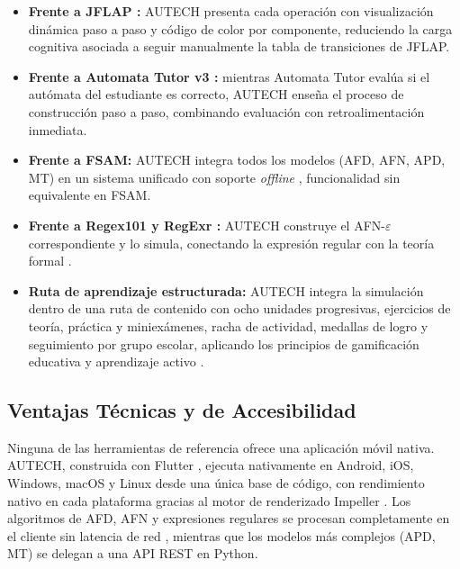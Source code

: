 \begin{itemize}
    \item \textbf{Frente a JFLAP \cite{rodger2006}:} AUTECH presenta cada operación con
    visualización dinámica paso a paso y código de color por componente, reduciendo la carga
    cognitiva \cite{sweller1988} asociada a seguir manualmente la tabla de transiciones de JFLAP.

    \item \textbf{Frente a Automata Tutor v3 \cite{aichernig2022}:} mientras Automata Tutor evalúa
    si el autómata del estudiante es correcto, AUTECH enseña el proceso de construcción paso a
    paso, combinando evaluación con retroalimentación inmediata.

    \item \textbf{Frente a FSAM:} AUTECH integra todos los modelos (AFD, AFN, APD, MT) en un
    sistema unificado con soporte \textit{offline} \cite{supabase2024}, funcionalidad sin
    equivalente en FSAM.

    \item \textbf{Frente a Regex101 y RegExr \cite{fycikas2021}\cite{skinner2021}:} AUTECH
    construye el AFN-$\varepsilon$ correspondiente y lo simula, conectando la expresión regular con
    la teoría formal \cite{hopcroft2007}\cite{thompson1968}.

    \item \textbf{Ruta de aprendizaje estructurada:} AUTECH integra la simulación dentro de una
    ruta de contenido con ocho unidades progresivas, ejercicios de teoría, práctica y
    miniexámenes, racha de actividad, medallas de logro y seguimiento por grupo escolar, aplicando
    los principios de gamificación educativa \cite{deterding2011} y aprendizaje activo
    \cite{felder2016}.
\end{itemize}

\subsection{Ventajas Técnicas y de Accesibilidad}
\label{subsec:ventajas_tecnicas}

Ninguna de las herramientas de referencia ofrece una aplicación móvil nativa. AUTECH, construida
con Flutter \cite{flutter2024c}, ejecuta nativamente en Android, iOS, Windows, macOS y Linux desde
una única base de código, con rendimiento nativo en cada plataforma gracias al motor de renderizado
Impeller \cite{flutter2024a}. Los algoritmos de AFD, AFN y expresiones regulares se procesan
completamente en el cliente sin latencia de red \cite{fielding2000}, mientras que los modelos más
complejos (APD, MT) se delegan a una API REST en Python.

